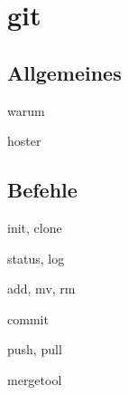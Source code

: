 \section{git}
  \subsection{Allgemeines}
    \begin{frame}{warum}
    \end{frame}

    \begin{frame}{hoster}
    \end{frame}

  \subsection{Befehle}
    \begin{frame}{init, clone}
    \end{frame}

    \begin{frame}{status, log}
    \end{frame}

    \begin{frame}{add, mv, rm}
    \end{frame}
    
    \begin{frame}{commit}
    \end{frame}
    
    \begin{frame}{push, pull}
    \end{frame}
    
    \begin{frame}{mergetool}
    \end{frame}
